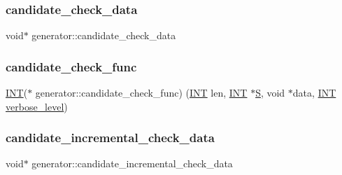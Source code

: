 \mbox{\label{classgenerator_ad5e5c1ae6a19af6869d590c328493a87}} 
\subsubsection{\texorpdfstring{candidate\+\_\+check\+\_\+data}{candidate\_check\_data}}
{\footnotesize\ttfamily void$\ast$ generator\+::candidate\+\_\+check\+\_\+data}

\mbox{\label{classgenerator_aa8921157f7660063029ac65461806e9c}} 
\subsubsection{\texorpdfstring{candidate\+\_\+check\+\_\+func}{candidate\_check\_func}}
{\footnotesize\ttfamily \mbox{\hyperlink{galois_8h_a09fddde158a3a20bd2dcadb609de11dc}{I\+NT}}($\ast$ generator\+::candidate\+\_\+check\+\_\+func) (\mbox{\hyperlink{galois_8h_a09fddde158a3a20bd2dcadb609de11dc}{I\+NT}} len, \mbox{\hyperlink{galois_8h_a09fddde158a3a20bd2dcadb609de11dc}{I\+NT}} $\ast$\mbox{\hyperlink{classgenerator_a5d2b65e2bd0e451744af1a47ba00bd96}{S}}, void $\ast$data, \mbox{\hyperlink{galois_8h_a09fddde158a3a20bd2dcadb609de11dc}{I\+NT}} \mbox{\hyperlink{classgenerator_a7fedc6488314cbc00dbfcc42d311e1ce}{verbose\+\_\+level}})}

\mbox{\label{classgenerator_ae85cfa00a35f333d1a52afba3ffe46d3}} 
\subsubsection{\texorpdfstring{candidate\+\_\+incremental\+\_\+check\+\_\+data}{candidate\_incremental\_check\_data}}
{\footnotesize\ttfamily void$\ast$ generator\+::candidate\+\_\+incremental\+\_\+check\+\_\+data}

